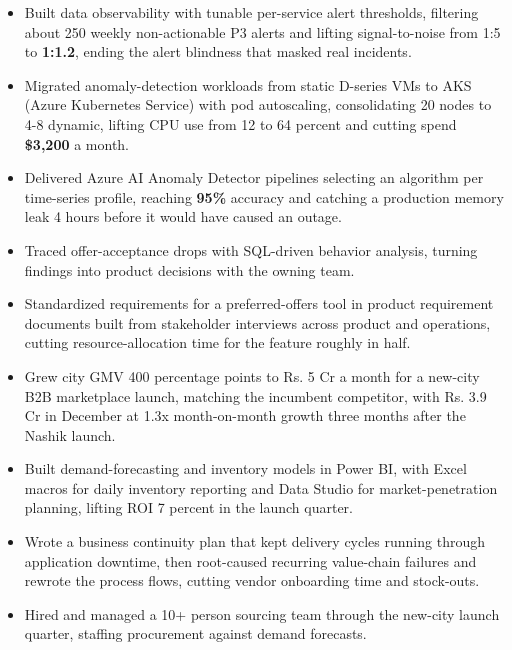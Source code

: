 \documentclass[letterpaper,10pt]{article}
\begin{document}
\begin{itemize}
\item Built data observability with tunable per-service alert thresholds, filtering about 250 weekly non-actionable P3 alerts and lifting signal-to-noise from 1:5 to \textbf{1:1.2}, ending the alert blindness that masked real incidents.
\item Migrated anomaly-detection workloads from static D-series VMs to AKS (Azure Kubernetes Service) with pod autoscaling, consolidating 20 nodes to 4-8 dynamic, lifting CPU use from 12 to 64 percent and cutting spend \textbf{\$3,200} a month.
\item Delivered Azure AI Anomaly Detector pipelines selecting an algorithm per time-series profile, reaching \textbf{95\%} accuracy and catching a production memory leak 4 hours before it would have caused an outage.
\end{itemize}

\begin{itemize}
\item Traced offer-acceptance drops with SQL-driven behavior analysis, turning findings into product decisions with the owning team.
\item Standardized requirements for a preferred-offers tool in product requirement documents built from stakeholder interviews across product and operations, cutting resource-allocation time for the feature roughly in half.
\end{itemize}

\begin{itemize}
\item Grew city GMV 400 percentage points to Rs. 5 Cr a month for a new-city B2B marketplace launch, matching the incumbent competitor, with Rs. 3.9 Cr in December at 1.3x month-on-month growth three months after the Nashik launch.
\item Built demand-forecasting and inventory models in Power BI, with Excel macros for daily inventory reporting and Data Studio for market-penetration planning, lifting ROI 7 percent in the launch quarter.
\item Wrote a business continuity plan that kept delivery cycles running through application downtime, then root-caused recurring value-chain failures and rewrote the process flows, cutting vendor onboarding time and stock-outs.
\item Hired and managed a 10+ person sourcing team through the new-city launch quarter, staffing procurement against demand forecasts.
\end{itemize}
\end{document}
